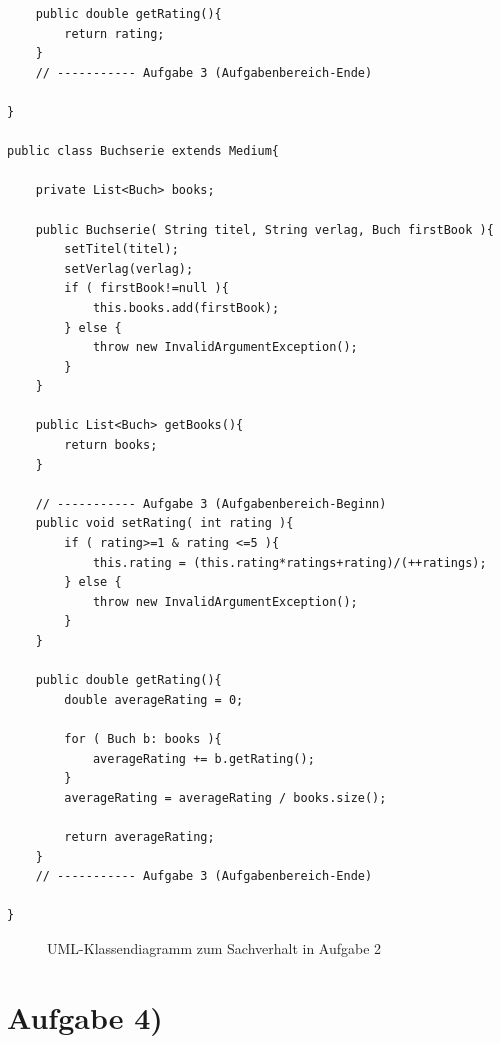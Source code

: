 \documentclass{swp1}
\begin{document}
\begin{lstlisting}
	public double getRating(){
		return rating;
	}
	// ----------- Aufgabe 3 (Aufgabenbereich-Ende)
	
}

public class Buchserie extends Medium{
	
	private List<Buch> books;
	
	public Buchserie( String titel, String verlag, Buch firstBook ){
		setTitel(titel);
		setVerlag(verlag);
		if ( firstBook!=null ){
			this.books.add(firstBook);
		} else {
			throw new InvalidArgumentException();
		}
	}
	
	public List<Buch> getBooks(){
		return books;
	}
	
	// ----------- Aufgabe 3 (Aufgabenbereich-Beginn)
	public void setRating( int rating ){
		if ( rating>=1 & rating <=5 ){
			this.rating = (this.rating*ratings+rating)/(++ratings);
		} else {
			throw new InvalidArgumentException();
		}
	}
	
	public double getRating(){
		double averageRating = 0;
		
		for ( Buch b: books ){
			averageRating += b.getRating();
		}
		averageRating = averageRating / books.size();
		
		return averageRating;
	}
	// ----------- Aufgabe 3 (Aufgabenbereich-Ende)
	
}
\end{lstlisting}

\begin{figure}[h]
\caption{UML-Klassendiagramm zum Sachverhalt in Aufgabe 2}
\label{ab3}
\end{figure}

\section*{Aufgabe 4)}
\end{document}
